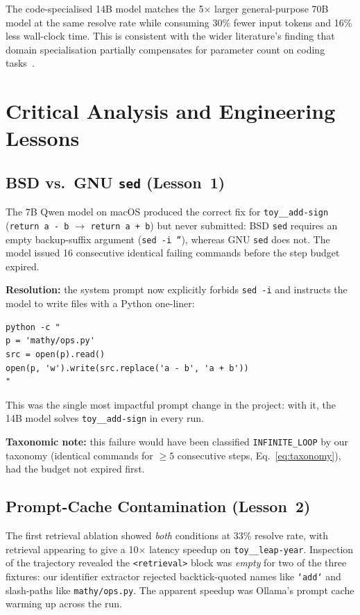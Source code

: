 \documentclass[11pt]{article}
\begin{document}
The code-specialised 14B model matches the 5$\times$ larger general-purpose
70B model at the same resolve rate while consuming 30\% fewer input tokens and
16\% less wall-clock time.  This is consistent with the wider literature's
finding that domain specialisation partially compensates for parameter count
on coding tasks~\citep{chen2021codex,li2022alphacode}.

\section{Critical Analysis and Engineering Lessons}
\label{sec:analysis}

\subsection{BSD vs.\ GNU \texttt{sed} (Lesson~1)}
\label{sec:bsd-sed}

The 7B Qwen model on macOS produced the correct fix for \texttt{toy\_\_add-sign}
(\texttt{return a - b} $\to$ \texttt{return a + b}) but never submitted: BSD
\texttt{sed} requires an empty backup-suffix argument (\texttt{sed -i ''}),
whereas GNU \texttt{sed} does not.  The model issued 16 consecutive identical
failing commands before the step budget expired.

\textbf{Resolution:} the system prompt now explicitly forbids \texttt{sed -i}
and instructs the model to write files with a Python one-liner:
\begin{lstlisting}
python -c "
p = 'mathy/ops.py'
src = open(p).read()
open(p, 'w').write(src.replace('a - b', 'a + b'))
"
\end{lstlisting}
This was the single most impactful prompt change in the project: with it, the
14B model solves \texttt{toy\_\_add-sign} in every run.

\textbf{Taxonomic note:} this failure would have been classified
\texttt{INFINITE\_LOOP} by our taxonomy (identical commands for $\geq 5$
consecutive steps, Eq.~\eqref{eq:taxonomy}), had the budget not expired first.

\subsection{Prompt-Cache Contamination (Lesson~2)}
\label{sec:cache}

The first retrieval ablation showed \emph{both} conditions at 33\% resolve
rate, with retrieval appearing to give a 10$\times$ latency speedup on
\texttt{toy\_\_leap-year}.  Inspection of the trajectory revealed the
\texttt{<retrieval>} block was \emph{empty} for two of the three fixtures:
our identifier extractor rejected backtick-quoted names like
\texttt{`add`} and slash-paths like \texttt{mathy/ops.py}.  The apparent
speedup was Ollama's prompt cache warming up across the run.
\end{document}
